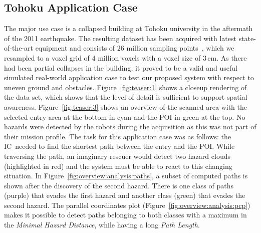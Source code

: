 \documentclass[conference,10pt,letter]{IEEEtran}
\def\IC{IC}
\begin{document}
\subsection{Tohoku Application Case} \label{sec:results:applicationcase}
The major use case is a collapsed building at Tohoku university in the aftermath of the 2011 earthquake. The resulting dataset has been acquired with latest state-of-the-art equipment and consists of $26$ million sampling points~\cite{journals/jfr/NagataniKOOYTNYKFK13}, which we resampled to a voxel grid of $4$ million voxels with a voxel size of 3\,cm. As there had been partial collapses in the building, it proved to be a valid and useful simulated real-world application case to test our proposed system with respect to uneven ground and obstacles. Figure~\ref{fig:teaser:1} shows a closeup rendering of the data set, which shows that the level of detail is sufficient to support spatial awareness. Figure~\ref{fig:teaser:3} shows an overview of the scanned area with the selected entry area at the bottom in cyan and the POI in green at the top. No hazards were detected by the robots during the acquisition as this was not part of their mission profile. The task for this application case was as follows: the \IC\ needed to find the shortest path between the entry and the POI. While traversing the path, an imaginary rescuer would detect two hazard clouds (highlighted in red) and the system must be able to react to this changing situation. In Figure~\ref{fig:overview:analysis:paths}, a subset of computed paths is shown after the discovery of the second hazard. There is one class of paths (purple) that evades the first hazard and another class (green) that evades the second hazard. The parallel coordinates plot (Figure~\ref{fig:overview:analysis:pcp}) makes it possible to detect paths belonging to both classes with a maximum in the \emph{Minimal Hazard Distance}, while having a long \emph{Path Length}.

\end{document}
